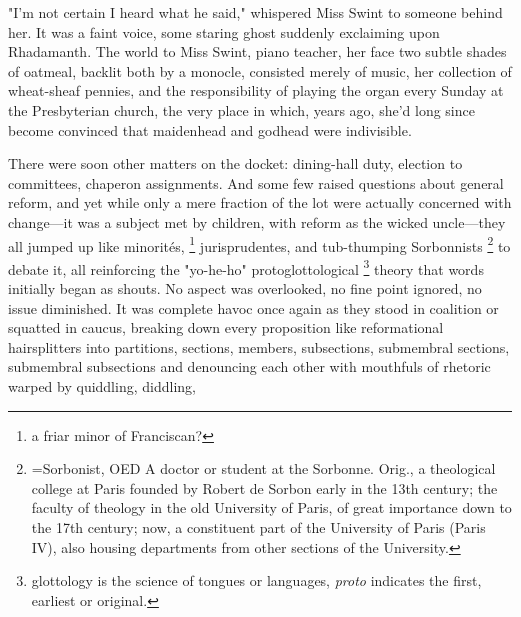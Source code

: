   "I'm not certain I heard what he said," whispered Miss Swint to someone behind
her. It was a faint voice, some staring ghost suddenly exclaiming upon
Rhadamanth. The world to Miss Swint, piano teacher, her face two subtle shades
of oatmeal, backlit both by a monocle, consisted merely of music, her collection
of wheat-sheaf pennies, and the responsibility of playing the organ every Sunday
at the Presbyterian church, the very place in which, years ago, she'd long since
become convinced that maidenhead and godhead were indivisible.

  There were soon other matters on the docket: 
dining-hall duty, election to committees, chaperon 
assignments. And some few raised questions about general
reform, and yet while only a mere fraction of the lot were actually concerned
with change---it was a subject met by children, with reform as the wicked
uncle---they all jumped up like minorités, 
\footnote{\textdbend a friar minor of Franciscan?}
jurisprudentes, and tub-thumping Sorbonnists 
\footnote{=Sorbonist, OED A doctor or student at the Sorbonne. Orig., a
theological college at Paris founded by Robert de Sorbon early in the 13th
century; the faculty of theology in the old University of Paris, of great
importance down to the 17th century; now, a constituent part of the University
of Paris (Paris IV), also housing departments from other sections of the
University.}
to debate it, all reinforcing the "yo-he-ho" protoglottological
\footnote{\textdbend glottology is the science of tongues or languages, 
  \textit{proto} indicates the first, earliest or original.}
theory that words initially began as shouts. No aspect was overlooked, no fine
point ignored, no issue diminished. It was complete havoc once again as they
stood in coalition or squatted 
in caucus, breaking down every proposition like reformational hairsplitters 
into partitions, sections, members, subsections,
submembral sections, submembral subsections and denouncing each other with
mouthfuls of rhetoric warped by quiddling, 
diddling, 
